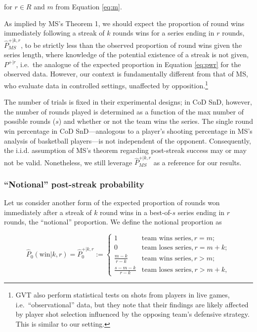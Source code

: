 \documentclass{article}
\begin{document}
for \(r \in R\) and \(m\) from Equation \ref{eq:m}.

As implied by MS's Theorem 1, we should expect the proportion of round
wins immediately following a streak of \(k\) rounds wins for a series
ending in \(r\) rounds, \(\hat{P}^{+|k,r}_{MS}\), to be strictly less
than the observed proportion of round wins given the series length,
where knowledge of the potential existence of a streak is not given,
\(P^{+|r}\), i.e.~the analogue of the expected proportion in Equation
\ref{eq:pwr} for the observed data. However, our context is
fundamentally different from that of MS, who evaluate data in controlled
settings, unaffected by opposition.\footnote{GVT also perform
  statistical tests on shots from players in live games,
  i.e.~``observational'' data, but they note that their findings are
  likely affected by player shot selection influenced by the opposing
  team's defensive strategy. This is similar to our setting.}

The number of trials is fixed in their experimental designs; in CoD SnD,
however, the number of rounds played is determined as a function of the
max number of possible rounds (\(s\)) and whether or not the team wins
the series. The single round win percentage in CoD SnD---analogous to a
player's shooting percentage in MS's analysis of basketball players---is
not independent of the opponent. Consequently, the i.i.d. assumption of
MS's theorem regarding post-streak success may or may not be valid.
Nonetheless, we still leverage \(\hat{P}^{+|k,r}_{MS}\) as a reference
for our results.

\hypertarget{notional-post-streak-probability}{%
\subsubsection{``Notional'' post-streak
probability}\label{notional-post-streak-probability}}

Let us consider another form of the expected proportion of rounds won
immediately after a streak of \(k\) round wins in a best-of-\(s\) series
ending in \(r\) rounds, the ``notional'' proportion. We define the
notional proportion as

\begin{equation}\label{eq:pwkr}
\hat{P}_0(\text{win} | k, r) = \hat{P}^{+|k,r}_0 := \begin{cases}
1 & \text{team wins series}, r = m; \\
0 & \text{team loses series}, r = m + k; \\
\frac{m - k}{r - k} & \text{team wins series}, r > m; \\
\frac{s - m - k}{r - k} & \text{team loses series}, r > m + k,
\end{cases}
\end{equation}
\end{document}
